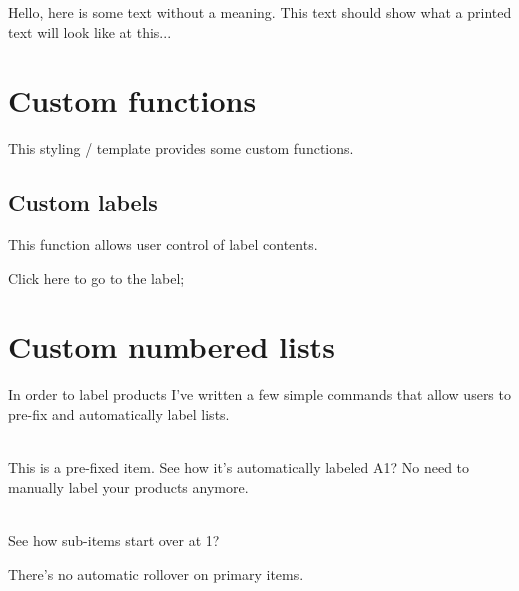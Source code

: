 \documentclass{report}
\begin{document}
	Hello,  here  is  some  text  without  a  meaning.   This  text  should
	show what a printed text will look like at this...
	
	\section{Custom functions}
	This styling / template provides some custom functions. 
	
	\subsection{Custom labels}
	This function allows user control of label contents. 
	
	
	Click here to go to the label;
	
	
	\newpage
		
	\section{Custom numbered lists}
	In order to label products I've written a few simple commands that allow users to pre-fix and automatically 
	label lists. 
	
	\begin{itemize}
		\\
		This is a pre-fixed item. See how it's automatically labeled A1? No need to manually label your products
		anymore. 
				
	
		\\
		See how sub-items start over at 1?
		
	\end{itemize}
	
	There's no automatic rollover on primary items. 
	
\end{document}
